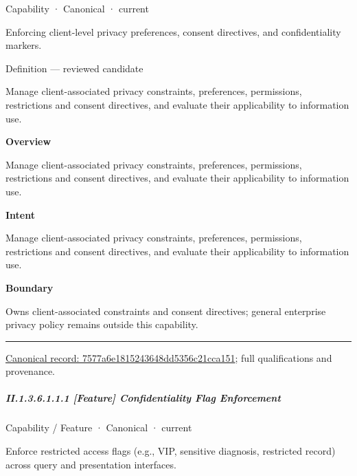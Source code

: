 \label{element:7577a6e1815243648dd5356c21cca151}
{\small Capability · Canonical · current}\par

Enforcing client-level privacy preferences, consent directives, and confidentiality markers.



Definition — reviewed candidate



Manage client-associated privacy constraints, preferences, permissions, restrictions and consent directives, and evaluate their applicability to information use.



\textbf{Overview}



Manage client-associated privacy constraints, preferences, permissions, restrictions and consent directives, and evaluate their applicability to information use.



\textbf{Intent}



Manage client-associated privacy constraints, preferences, permissions, restrictions and consent directives, and evaluate their applicability to information use.



\textbf{Boundary}



Owns client-associated constraints and consent directives; general enterprise privacy policy remains outside this capability.



\medskip\hrule\medskip

{\footnotesize \href{../../../../continuum/strategy/capability/7577a6e1815243648dd5356c21cca151.md}{Canonical record: 7577a6e1815243648dd5356c21cca151}; full qualifications and provenance.}\par
\subparagraph*{II.1.3.6.1.1.1 [Feature] Confidentiality Flag Enforcement}
\label{navigation:II.1.3.6.1.1.1}

\label{element:1c18e7c2ccf640c9afc2525503b505a6}
{\small Capability / Feature · Canonical · current}\par

Enforce restricted access flags (e.g., VIP, sensitive diagnosis, restricted record) across query and presentation interfaces.



